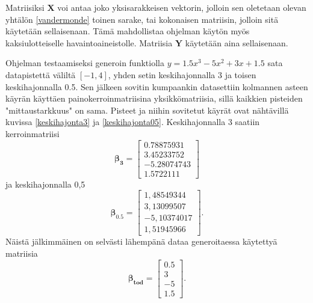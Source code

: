 \documentclass[12pt,a4paper,titlepage]{article}
\newcommand{\matr}[1]{\bm{#1}}
\begin{document}
Matriisiksi $\matr{X}$ voi antaa joko yksisarakkeisen vektorin, jolloin sen oletetaan olevan yhtälön \ref{vandermonde} toinen sarake, tai kokonaisen matriisin, jolloin sitä käytetään sellaisenaan. Tämä mahdollistaa ohjelman käytön myös kaksiulotteiselle havaintoaineistolle. Matriisia $\matr{Y}$ käytetään aina sellaisenaan.

Ohjelman testaamiseksi generoin funktiolla $y=1.5x^3-5x^2+3x+1.5$ sata datapistettä väliltä $[-1, 4]$, yhden setin keskihajonnalla 3 ja toisen keskihajonnalla 0.5. Sen jälkeen sovitin kumpaankin datasettiin kolmannen asteen käyrän käyttäen painokerroinmatriisina yksikkömatriisia, sillä kaikkien pisteiden "mittaustarkkuus" on sama. Pisteet ja niihin sovitetut käyrät ovat nähtävillä kuvissa \ref{keskihajonta3} ja \ref{keskihajonta05}. Keskihajonnalla 3 saatiin kerroinmatriisi
\begin{equation*}
	\matr{\beta_{3}}
	=
	\begin{bmatrix}
		0.78875931 \\
 		3.45233752 \\
 		-5.28074743 \\
		1.5722111
	\end{bmatrix}
\end{equation*}
ja keskihajonnalla 0,5
\begin{equation*}
	\matr{\beta_{0.5}}
	=
	\begin{bmatrix}
		1,48549344 \\
 		3,13099507 \\
 		-5,10374017 \\
  		1,51945966
  	\end{bmatrix}.
\end{equation*}
Näistä jälkimmäinen on selvästi lähempänä dataa generoitaessa käytettyä matriisia
\begin{equation*}
	\matr{\beta_{\text{tod}}}
	=
	\begin{bmatrix}
		0.5 \\
 		3 \\
 		-5 \\
  		1.5
  	\end{bmatrix}.
\end{equation*}
\end{document}
